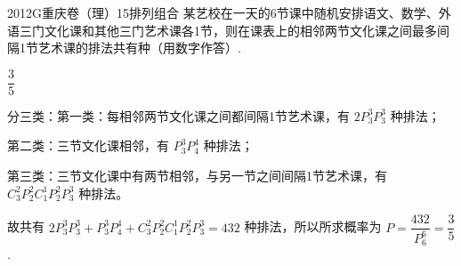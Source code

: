 
\begin{problem}{2012}{G}{重庆卷（理）}{15}{排列组合}
某艺校在一天的6节课中随机安排语文、数学、外语三门文化课和其他三门艺术课各1节，则在课表上的相邻两节文化课之间最多间隔1节艺术课的排法共有\underline{\hspace{4em}}种（用数字作答）.
\end{problem}

\begin{answer}
$\dfrac{3}{5}$
\end{answer}

\begin{solutions}
分三类：第一类：每相邻两节文化课之间都间隔1节艺术课，有 $ 2P_3^3P_3^3 $ 种排法；

第二类：三节文化课相邻，有 $ P_3^3P_4^4 $ 种排法；

第三类：三节文化课中有两节相邻，与另一节之间间隔1节艺术课，有 $ C_3^2P_2^2C_1^1P_2^2P_3^3 $ 种排法。

故共有 $ 2P_3^3P_3^3 + P_3^3P_4^4 + C_3^2P_2^2C_1^1P_2^2P_3^3 = 432 $ 种排法，所以所求概率为 $ P = \dfrac{432}{P_6^6} = \dfrac{3}{5} $.
\end{solutions}
